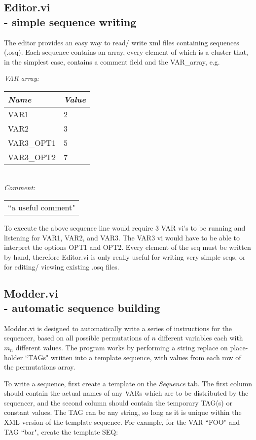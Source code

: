 \documentclass[10pt,a4paper]{article}
\begin{document}
\subsection[Editor.vi ]{Editor.vi \\ %
	\normalsize - simple sequence writing}
The editor provides an easy way to read/ write xml files containing sequences (.osq).  Each sequence contains an array, every element of which is a cluster that, in the simplest case, contains a comment field and the VAR\_array, e.g.

\hangindent=0.7cm
\emph{VAR array:} \\
\begin{tabularx}{0.4\textwidth}{X|X}
	\emph{Name} & \emph{Value} \\
	\hline
	VAR1 & 2 \\
	VAR2 & 3 \\
	VAR3\_OPT1 & 5 \\
	VAR3\_OPT2 & 7
\end{tabularx}
\vspace{3mm} \\
\emph{Comment:} \\
\begin{tabularx}{0.85\textwidth}{l}
	``a useful comment"
\end{tabularx}
\vspace{3mm}

To execute the above sequence line would require 3 VAR vi's to be running and listening for VAR1, VAR2, and VAR3.  The VAR3 vi would have to be able to interpret the options OPT1 and OPT2.  Every element of the seq must be written by hand, therefore Editor.vi is only really useful for writing very simple seqs, or for editing/ viewing existing .osq files.

\subsection[Modder.vi]{\label{sex:modder}Modder.vi \\ %
	\normalsize - automatic sequence building}

Modder.vi is designed to automatically write a series of instructions for the sequencer, based on all possible permutations of $n$ different variables each with $m_n$ different values.  The program works by performing a string replace on place-holder ``TAGs" written into a template sequence, with values from each row of the permutations array.  

To write a sequence, first create a template on the \emph{Sequence} tab.  The first column should contain the actual names of any VARs which are to be distributed by the sequencer, and the second column should contain the temporary TAG(s) or constant values.  The TAG can be any string, so long as it is unique within the XML version of the template sequence.  For example, for the VAR ``FOO" and TAG ``bar", create the template SEQ:
\end{document}
